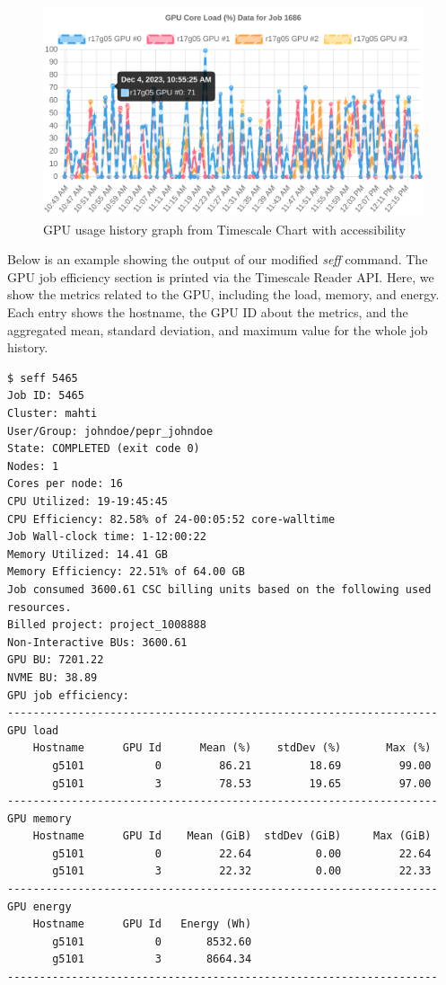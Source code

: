 \begin{figure}[H]
    \centering
    \includegraphics[width=1\textwidth]{figures/usage-accessibility-graph.png}
    \caption{GPU usage history graph from Timescale Chart with accessibility}
    \label{fig_gpu-usage-graph-accessibility}
\end{figure}

Below is an example showing the output of our modified \textit{seff} command. The GPU job efficiency section is printed via the Timescale Reader API. Here, we show the metrics related to the GPU, including the load, memory, and energy. Each entry shows the hostname, the GPU ID about the metrics, and the aggregated mean, standard deviation, and maximum value for the whole job history.

\clearpage

\begin{lstlisting}
$ seff 5465
Job ID: 5465
Cluster: mahti
User/Group: johndoe/pepr_johndoe
State: COMPLETED (exit code 0)
Nodes: 1
Cores per node: 16
CPU Utilized: 19-19:45:45
CPU Efficiency: 82.58% of 24-00:05:52 core-walltime
Job Wall-clock time: 1-12:00:22
Memory Utilized: 14.41 GB
Memory Efficiency: 22.51% of 64.00 GB
Job consumed 3600.61 CSC billing units based on the following used resources.
Billed project: project_1008888
Non-Interactive BUs: 3600.61
GPU BU: 7201.22
NVME BU: 38.89
GPU job efficiency:
-------------------------------------------------------------------
GPU load
    Hostname      GPU Id      Mean (%)    stdDev (%)       Max (%)
       g5101           0         86.21         18.69         99.00
       g5101           3         78.53         19.65         97.00
-------------------------------------------------------------------
GPU memory
    Hostname      GPU Id    Mean (GiB)  stdDev (GiB)     Max (GiB)
       g5101           0         22.64          0.00         22.64
       g5101           3         22.32          0.00         22.33
-------------------------------------------------------------------
GPU energy
    Hostname      GPU Id   Energy (Wh)
       g5101           0       8532.60
       g5101           3       8664.34
-------------------------------------------------------------------
\end{lstlisting}

